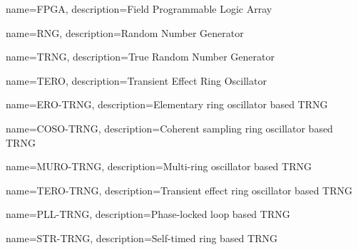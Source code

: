 {
    name=FPGA, %
    description={Field Programmable Logic Array}
}

{
    name=RNG,
    description={Random Number Generator}
}

{
    name=TRNG,
    description={True Random Number Generator}
}

{
    name=TERO,
    description={Transient Effect Ring Oscillator}
}

{
    name=ERO-TRNG,
    description={Elementary ring oscillator based TRNG}
}

{
    name=COSO-TRNG,
    description={Coherent sampling ring oscillator based TRNG}
}

{
    name=MURO-TRNG,
    description={Multi-ring oscillator based TRNG}
}


{
    name=TERO-TRNG,
    description={Transient effect ring oscillator based TRNG}
}

{
    name=PLL-TRNG,
    description={Phase-locked loop based TRNG}
}


{
    name=STR-TRNG,
    description={Self-timed ring based TRNG}
}
